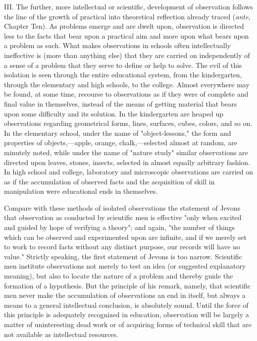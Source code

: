 \documentclass[showtrims,ustradepaper]{memoir}
\begin{document}
III. The further, more intellectual or scientific, development of
observation follows the line of the growth of practical into theoretical
reflection already traced (\emph{ante}, Chapter Ten). As problems emerge and are dwelt upon, observation is directed
less to the facts that bear upon a practical aim and more upon what
bears upon a problem as such. What makes observations in schools often
intellectually ineffective is (more than anything else) that they are
carried on independently of a sense of a problem that they serve to
define or help to solve. The evil of this isolation is seen through the
entire educational system, from the kindergarten, through the elementary
and high schools, to the college. Almost everywhere may be found, at
some time, recourse to observations as if they were of complete and
final value in themselves, instead of the
means
of getting material that bears upon some difficulty and its solution. In
the kindergarten are heaped up observations regarding geometrical forms,
lines, surfaces, cubes, colors, and so on. In the elementary school,
under the name of "object-lessons," the form and properties of
objects,---apple, orange, chalk,---selected almost at random, are
minutely noted, while under the name of "nature study" similar
observations are directed upon leaves, stones, insects, selected in
almost equally arbitrary fashion. In high school and college, laboratory
and microscopic observations are carried on as if the accumulation of
observed facts and the acquisition of skill in manipulation were
educational ends in themselves.

Compare with these methods of isolated observations the statement of
Jevons that observation as conducted by scientific men is effective
"only when excited and guided by hope of verifying a theory"; and again,
"the number of things which can be observed and experimented upon are
infinite, and if we merely set to work to record facts without any
distinct purpose, our records will have no value." Strictly speaking,
the first statement of Jevons is too narrow. Scientific men institute
observations not merely to test an idea (or suggested explanatory
meaning), but also to locate the nature of a problem and thereby guide
the formation of a hypothesis. But the principle of his remark, namely,
that scientific men never make the accumulation of observations an end
in itself, but always a means to a general intellectual conclusion, is
absolutely sound. Until the force of this principle is adequately
recognized in education, observation will be largely a matter of
uninteresting dead work or of acquiring forms of technical skill that
are not available as intellectual
resources.
\end{document}
